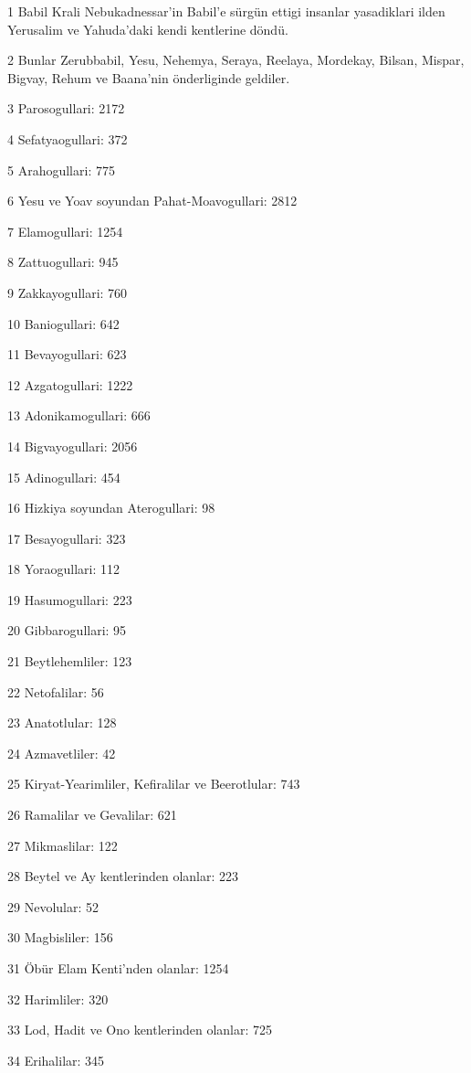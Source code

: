 \par 1 Babil Krali Nebukadnessar'in Babil'e sürgün ettigi insanlar yasadiklari ilden Yerusalim ve Yahuda'daki kendi kentlerine döndü.
\par 2 Bunlar Zerubbabil, Yesu, Nehemya, Seraya, Reelaya, Mordekay, Bilsan, Mispar, Bigvay, Rehum ve Baana'nin önderliginde geldiler.
\par 3 Parosogullari: 2172
\par 4 Sefatyaogullari: 372
\par 5 Arahogullari: 775
\par 6 Yesu ve Yoav soyundan Pahat-Moavogullari: 2812
\par 7 Elamogullari: 1254
\par 8 Zattuogullari: 945
\par 9 Zakkayogullari: 760
\par 10 Baniogullari: 642
\par 11 Bevayogullari: 623
\par 12 Azgatogullari: 1222
\par 13 Adonikamogullari: 666
\par 14 Bigvayogullari: 2056
\par 15 Adinogullari: 454
\par 16 Hizkiya soyundan Aterogullari: 98
\par 17 Besayogullari: 323
\par 18 Yoraogullari: 112
\par 19 Hasumogullari: 223
\par 20 Gibbarogullari: 95
\par 21 Beytlehemliler: 123
\par 22 Netofalilar: 56
\par 23 Anatotlular: 128
\par 24 Azmavetliler: 42
\par 25 Kiryat-Yearimliler, Kefiralilar ve Beerotlular: 743
\par 26 Ramalilar ve Gevalilar: 621
\par 27 Mikmaslilar: 122
\par 28 Beytel ve Ay kentlerinden olanlar: 223
\par 29 Nevolular: 52
\par 30 Magbisliler: 156
\par 31 Öbür Elam Kenti'nden olanlar: 1254
\par 32 Harimliler: 320
\par 33 Lod, Hadit ve Ono kentlerinden olanlar: 725
\par 34 Erihalilar: 345

